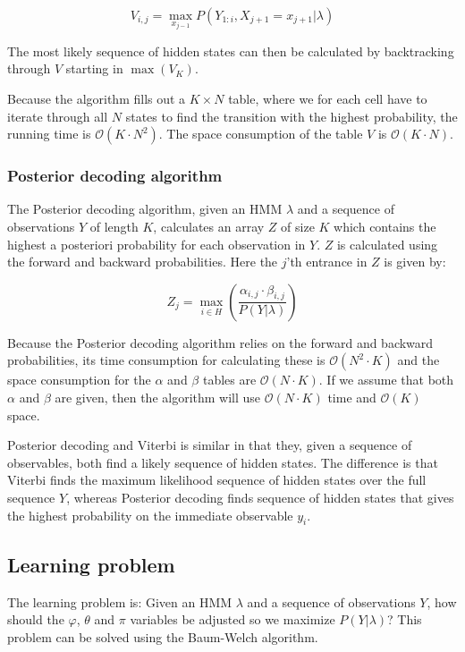 $$V_{i,j} = \max\limits_{x_{j-1}} P(Y_{1:i}, X_{j+1} = x_{j+1}|\lambda)$$

The most likely sequence of hidden states can then be calculated by backtracking through $V$ starting in $\max(V_K)$.

Because the algorithm fills out a $ K \times  N $ table, where we for each cell have to iterate through all $ N $ states to find the transition with the highest probability, the running time is $\mathcal{O}(K \cdot  N ^2)$. The space consumption of the table $V$ is $\mathcal{O}(K \cdot  N )$.

\subsubsection{Posterior decoding algorithm}

The Posterior decoding algorithm\cite{Bishop}, given an HMM $\lambda$ and a sequence of observations $Y$ of length $K$, calculates an array $Z$ of size $K$ which contains the highest a posteriori probability for each observation in $Y$. 
$Z$ is calculated using the forward and backward probabilities. Here the $j$'th entrance in $Z$ is given by:

$$Z_j = \max\limits_{i\in H} (\frac{\alpha_{i,j}\cdot\beta_{i,j}}{P(Y|\lambda)})$$

Because the Posterior decoding algorithm relies on the forward and backward probabilities, its time consumption for calculating these is $\mathcal{O}( N^2\cdot K)$ and the space consumption for the $\alpha$ and $\beta$ tables are $\mathcal{O}( N\cdot K)$. If we assume that both $\alpha$ and $\beta$ are given, then the algorithm will use $\mathcal{O}( N\cdot K)$ time and $\mathcal{O}(K)$
space.

Posterior decoding and Viterbi is similar in that they, given a sequence of observables, both find a likely sequence of hidden states. The difference is that Viterbi finds the maximum likelihood sequence of hidden states over the full sequence $Y$, whereas Posterior decoding finds sequence of hidden states that gives the highest probability on the immediate observable $y_i$.

\subsection{Learning problem}

The learning problem is: Given an HMM $\lambda$ and a sequence of observations $Y$, how should the $\varphi$, $\theta$ and $\pi$ variables be adjusted so we maximize $P(Y|\lambda)$? This problem can be solved using the Baum-Welch algorithm.

